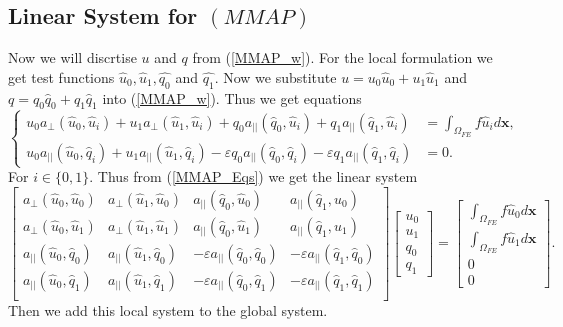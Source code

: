 \documentclass[12pt]{ociamthesis}
\begin{document}
\subsection{Linear System for $(MMAP)$}
Now we will discrtise $u$ and  $q$ from (\ref{MMAP_w}). For the local formulation we get test functions $\hat{u}_0, \hat{u}_1, \hat{q_0}$ and $\hat{q_1}$. Now we substitute $u = u_0 \hat{u}_0 + u_1\hat{u}_1$ and $q = q_0\hat{q}_0 + q_1\hat{q}_1$ into (\ref{MMAP_w}). Thus we get equations
\begin{equation} \label{MMAP_Eqs}
\begin{cases}
u_0a_{\perp}(\hat{u}_0, \hat{u}_i) +
u_1a_{\perp}(\hat{u}_1, \hat{u}_i) +
q_0a_{||}(\hat{q}_0, \hat{u}_i) +
q_1a_{||}(\hat{q}_1, \hat{u}_i) &=
\int_{\Omega_{FE}} f \hat{u}_i d\mathbf{x}, \\
u_0a_{||}(\hat{u}_0, \hat{q}_i) +
u_1a_{||}(\hat{u}_1, \hat{q}_i) -
\varepsilon q_0a_{||}(\hat{q}_0, \hat{q}_i) -
\varepsilon q_1a_{||}(\hat{q}_1, \hat{q}_i) &=
0.
\end{cases}
\end{equation}
For $i\in\{0,1\}$. Thus from (\ref{MMAP_Eqs}) we get the linear system
\begin{equation}
\left [
\begin{matrix}
a_{\perp}(\hat{u}_0, \hat{u}_0) &
a_{\perp}(\hat{u}_1, \hat{u}_0) &
a_{||}(\hat{q}_0, \hat{u}_0) &
a_{||}(\hat{q}_1, \hat{u}_0) \\
a_{\perp}(\hat{u}_0, \hat{u}_1) &
a_{\perp}(\hat{u}_1, \hat{u}_1) &
a_{||}(\hat{q}_0, \hat{u}_1) &
a_{||}(\hat{q}_1, \hat{u}_1) \\
a_{||}(\hat{u}_0, \hat{q}_0) &
a_{||}(\hat{u}_1, \hat{q}_0) &
-\varepsilon a_{||}(\hat{q}_0, \hat{q}_0) &
-\varepsilon a_{||}(\hat{q}_1, \hat{q}_0) \\
a_{||}(\hat{u}_0, \hat{q}_1) &
a_{||}(\hat{u}_1, \hat{q}_1) &
-\varepsilon a_{||}(\hat{q}_0, \hat{q}_1) &
-\varepsilon a_{||}(\hat{q}_1, \hat{q}_1) \\
\end{matrix}
\right ]
\left [
\begin{matrix}
u_0 \\
u_1 \\
q_0 \\
q_1
\end{matrix}
\right ] =
\left [
\begin{matrix}
\int_{\Omega_{FE}}f\hat{u}_0 d \mathbf{x} \\
\int_{\Omega_{FE}}f\hat{u}_1 d \mathbf{x} \\
0 \\
0
\end{matrix}
\right ].
\end{equation}
Then we add this local system to the global system.
\end{document}
